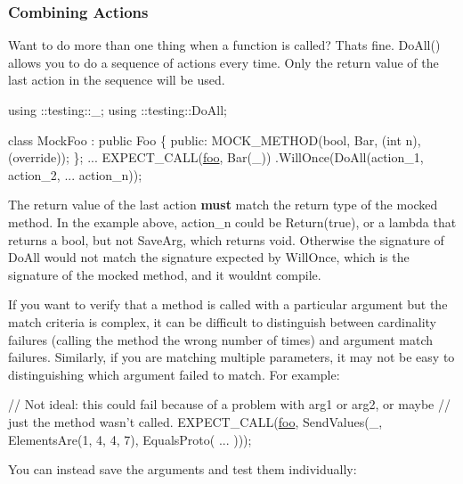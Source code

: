 \subsubsection*{Combining Actions}

Want to do more than one thing when a function is called? That\textquotesingle{}s fine. {\ttfamily Do\+All()} allows you to do a sequence of actions every time. Only the return value of the last action in the sequence will be used.


\begin{DoxyCode}
using ::testing::\_;
using ::testing::DoAll;

\textcolor{keyword}{class }MockFoo : \textcolor{keyword}{public} Foo \{
 \textcolor{keyword}{public}:
  MOCK\_METHOD(\textcolor{keywordtype}{bool}, Bar, (\textcolor{keywordtype}{int} n), (\textcolor{keyword}{override}));
\};
...
  EXPECT\_CALL(\mbox{\hyperlink{namespacefoo}{foo}}, Bar(\_))
      .WillOnce(DoAll(action\_1,
                      action\_2,
                      ...
                      action\_n));
\end{DoxyCode}


The return value of the last action {\bfseries must} match the return type of the mocked method. In the example above, {\ttfamily action\+\_\+n} could be {\ttfamily Return(true)}, or a lambda that returns a {\ttfamily bool}, but not {\ttfamily Save\+Arg}, which returns {\ttfamily void}. Otherwise the signature of {\ttfamily Do\+All} would not match the signature expected by {\ttfamily Will\+Once}, which is the signature of the mocked method, and it wouldn\textquotesingle{}t compile.

If you want to verify that a method is called with a particular argument but the match criteria is complex, it can be difficult to distinguish between cardinality failures (calling the method the wrong number of times) and argument match failures. Similarly, if you are matching multiple parameters, it may not be easy to distinguishing which argument failed to match. For example\+:


\begin{DoxyCode}
\textcolor{comment}{// Not ideal: this could fail because of a problem with arg1 or arg2, or maybe}
\textcolor{comment}{// just the method wasn't called.}
EXPECT\_CALL(\mbox{\hyperlink{namespacefoo}{foo}}, SendValues(\_, ElementsAre(1, 4, 4, 7), EqualsProto( ... )));
\end{DoxyCode}


You can instead save the arguments and test them individually\+:


